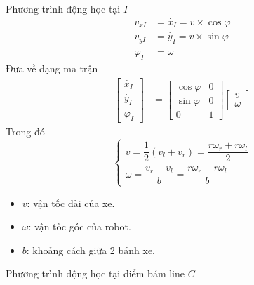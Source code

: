           \hspace*{0.6cm}Phương trình động học tại $I$
          \begin{align*}
               v_{xI} &= \dot{x_I} = v \times \cos \varphi\\
               v_{yI} &= \dot{y_I} = v \times \sin \varphi\\
               \dot{\varphi_I} &= \omega
          \end{align*} 
          Đưa về dạng ma trận
          \begin{align}
               \begin{bmatrix}
                    \dot{x_I} \\
                    \dot{y_I} \\
                    \dot{\varphi_I}
                    \end{bmatrix} &= \begin{bmatrix}
                    \cos\varphi & 0 \\
                    \sin\varphi & 0 \\
                    0 & 1
                    \end{bmatrix} \begin{bmatrix}
                    v \\
                    \omega
               \end{bmatrix}
               \label{c5_e1}
          \end{align}
          \hspace*{0.6cm}Trong đó
          \begin{equation*}
               \begin{cases}
                    v = \dfrac{1}{2}(v_l + v_r) = \dfrac{r\omega_r + r\omega_l}{2} \\[0.5em]
                    \omega = \dfrac{v_r - v_l}{b} = \dfrac{r\omega_r - r\omega_l}{b}
               \end{cases}               
          \end{equation*}
          \begin{itemize}
               \item $v$: vận tốc dài của xe.
               \item $\omega$: vận tốc góc của robot.
               \item $b$: khoảng cách giữa 2 bánh xe.
          \end{itemize}
          \hspace*{0.6cm}Phương trình động học tại điểm bám line $C$
